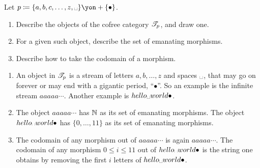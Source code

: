 \documentclass[Book-Poly]{subfiles}
\begin{document}
\begin{exercise}
Let $p\coloneqq \{a,b,c,\ldots,z,\text{\textvisiblespace}\}\yon+\{\bullet\}$.
\begin{enumerate}
	\item Describe the objects of the cofree category $\mathscr{T}_{p}$, and draw one.
	\item For a given such object, describe the set of emanating morphisms.
	\item Describe how to take the codomain of a morphism.
\qedhere
\end{enumerate}
\begin{solution}
\begin{enumerate}
    \item An object in $\mathscr{T}_{p}$ is a stream of letters $a,b,\ldots,z$ and spaces $\text{\textvisiblespace}$, that may go on forever or may end with a gigantic period, ``$\bullet$''. So an example is the infinite stream $aaaaa\cdots$. Another example is $hello\text{\textvisiblespace}world\bullet$.
    \item The object $aaaaa\cdots$ has $\mathbb{N}$ as its set of emanating morphisms. The object $hello\text{\textvisiblespace}world\bullet$ has $\{0,\ldots,11\}$ as its set of emanating morphisms.
    \item The codomain of any morphism out of $aaaaa\cdots$ is again $aaaaa\cdots$. The codomain of any morphism $0\leq i\leq 11$ out of $hello\text{\textvisiblespace}world\bullet$ is the string one obtains by removing the first $i$ letters of $hello\text{\textvisiblespace}world\bullet$.
\end{enumerate}
\end{solution}
\end{exercise}
\end{document}
